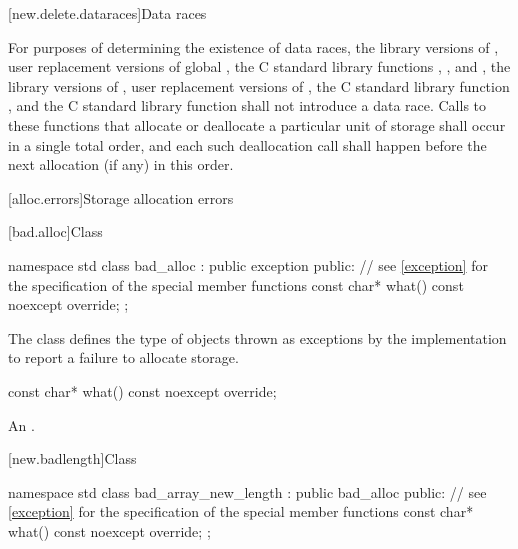 [new.delete.dataraces]{Data races}

\pnum
For purposes of determining the existence of data races, the library versions
of , user replacement versions of global ,
the C standard library functions
, , and ,
the library
versions of , user replacement
versions of , the C standard library function
, and the C standard library function  shall not
introduce a data race.
Calls to these functions that allocate or deallocate a particular unit
of storage shall occur in a single total order, and each such deallocation call
shall happen before the next allocation (if any) in
this order.

[alloc.errors]{Storage allocation errors}

%
[bad.alloc]{Class }

%
\begin{codeblock}
namespace std {
  class bad_alloc : public exception {
  public:
    // see \ref{exception} for the specification of the special member functions
    const char* what() const noexcept override;
  };
}
\end{codeblock}

\pnum
The class
defines the type of objects thrown as
exceptions by the implementation to report a failure to allocate storage.

%
\begin{itemdecl}
const char* what() const noexcept override;
\end{itemdecl}

\begin{itemdescr}
\pnum
\returns
An  \ntbs{}.
\end{itemdescr}

%
%
[new.badlength]{Class }

\begin{codeblock}
namespace std {
  class bad_array_new_length : public bad_alloc {
  public:
    // see \ref{exception} for the specification of the special member functions
    const char* what() const noexcept override;
  };
}
\end{codeblock}

